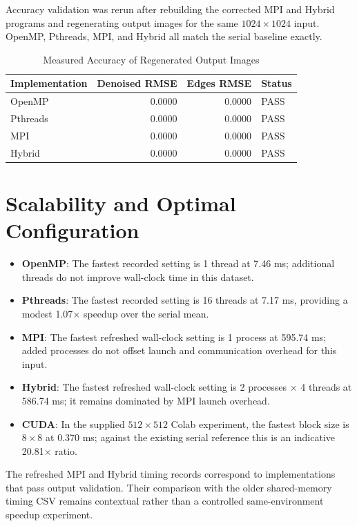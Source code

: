 \documentclass[12pt,a4paper]{report}
\begin{document}
Accuracy validation was rerun after rebuilding the corrected MPI and Hybrid programs and
regenerating output images for the same $1024 \times 1024$ input. OpenMP, Pthreads, MPI,
and Hybrid all match the serial baseline exactly.

\begin{table}[H]
    \centering
    \begin{tabular}{|l|r|r|l|}
    \hline
    \textbf{Implementation} & \textbf{Denoised RMSE} & \textbf{Edges RMSE} & \textbf{Status} \\
    \hline
    OpenMP & 0.0000 & 0.0000 & PASS \\
    Pthreads & 0.0000 & 0.0000 & PASS \\
    MPI & 0.0000 & 0.0000 & PASS \\
    Hybrid & 0.0000 & 0.0000 & PASS \\
    \hline
    \end{tabular}
    \caption{Measured Accuracy of Regenerated Output Images}
\end{table}

\section{Scalability and Optimal Configuration}

\begin{itemize}
    \item \textbf{OpenMP}: The fastest recorded setting is 1 thread at 7.46 ms; additional threads do not improve wall-clock time in this dataset.
    \item \textbf{Pthreads}: The fastest recorded setting is 16 threads at 7.17 ms, providing a modest 1.07$\times$ speedup over the serial mean.
    \item \textbf{MPI}: The fastest refreshed wall-clock setting is 1 process at 595.74 ms; added processes do not offset launch and communication overhead for this input.
    \item \textbf{Hybrid}: The fastest refreshed wall-clock setting is 2 processes $\times$ 4 threads at 586.74 ms; it remains dominated by MPI launch overhead.
    \item \textbf{CUDA}: In the supplied $512 \times 512$ Colab experiment, the fastest block size is $8 \times 8$ at 0.370 ms; against the existing serial reference this is an indicative 20.81$\times$ ratio.
\end{itemize}

The refreshed MPI and Hybrid timing records correspond to implementations that pass output
validation. Their comparison with the older shared-memory timing CSV remains contextual
rather than a controlled same-environment speedup experiment.
\end{document}

